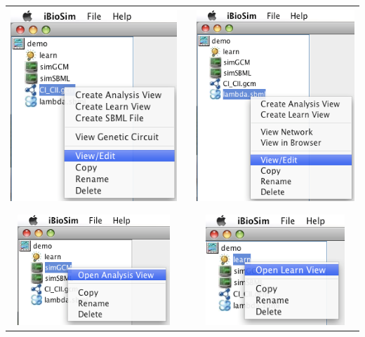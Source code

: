 \documentclass[titlepage,11pt]{article}
\begin{document}
\begin{center}
\begin{tabular}{ccc}
\includegraphics[height=74mm]{screenshots/modGCM} & &
\includegraphics[height=74mm]{screenshots/modSBML} \\ \\
\includegraphics[height=42mm]{screenshots/modAnalysis} & &
\includegraphics[height=42mm]{screenshots/modLearn}
\end{tabular}
\end{center}
\end{document}
